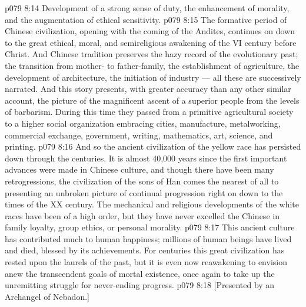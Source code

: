\vs p079 8:14 \bibnobreakspace Development of a strong sense of duty, the enhancement of morality, and the augmentation of ethical sensitivity.
\vs p079 8:15 \pc The formative period of Chinese civilization, opening with the coming of the Andites, continues on down to the great ethical, moral, and semireligious awakening of the VI century before Christ. And Chinese tradition preserves the hazy record of the evolutionary past; the transition from mother\hyp{} to father\hyp{}family, the establishment of agriculture, the development of architecture, the initiation of industry --- all these are successively narrated. And this story presents, with greater accuracy than any other similar account, the picture of the magnificent ascent of a superior people from the levels of barbarism. During this time they passed from a primitive agricultural society to a higher social organization embracing cities, manufacture, metalworking, commercial exchange, government, writing, mathematics, art, science, and printing.
\vs p079 8:16 And so the ancient civilization of the yellow race has persisted down through the centuries. It is almost 40,000 years since the first important advances were made in Chinese culture, and though there have been many retrogressions, the civilization of the sons of Han comes the nearest of all to presenting an unbroken picture of continual progression right on down to the times of the XX century. The mechanical and religious developments of the white races have been of a high order, but they have never excelled the Chinese in family loyalty, group ethics, or personal morality.
\vs p079 8:17 This ancient culture has contributed much to human happiness; millions of human beings have lived and died, blessed by its achievements. For centuries this great civilization has rested upon the laurels of the past, but it is even now reawakening to envision anew the transcendent goals of mortal existence, once again to take up the unremitting struggle for never\hyp{}ending progress.
\vsetoff
\vs p079 8:18 [Presented by an Archangel of Nebadon.]
\quizlink
